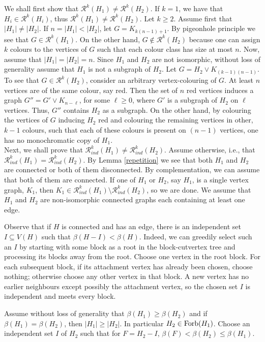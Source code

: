 \documentclass[10pt,a4paper]{article}
\theoremstyle{plain}
\theoremstyle{definition}
\newcommand{\R}{\mathcal{R}}
\newcommand{\Forb}{{\rm Forb}}
\newcommand{\Rk}{\R_{ind}}
\begin{document}
   We shall first show that $\R^k(H_1) \neq \R^k(H_2)$. If $k=1$, we have that $H_i\in \R^k(H_i)$, thus $\R^k(H_1)\neq \R^k(H_2)$. Let $k\geq 2$.
   Assume first that $|H_1|\neq |H_2|$.  If $n=|H_1|<|H_2|$, let  $G=K_{k(n-1)+1}$.  By pigeonhole principle we see that $G\in \R^k(H_1)$. On the other hand, $G\not\in \R^k(H_2)$ because one can assign $k$ colours to the vertices of $G$ such that each colour class has size at most $n$.
   Now, assume that $|H_1|=|H_2|=n$. Since $H_1$ and $H_2$ are not isomorphic, without loss of generality assume that $H_1$ is not a subgraph of $H_2$.
   Let $G=H_2\vee K_{(k-1)(n-1)}$. To see that  $G\in \R^k(H_2)$, consider an arbitrary vertex-colouring of $G$. At least $n$ vertices are of the same colour, say red. Then the set of $n$ red vertices induces 
   a graph $G''=G'\vee K_{n-\ell}$, for some $\ell\geq 0$, where $G'$ is a subgraph of $H_2$ on $\ell$ vertices. Thus, $G''$ contains $H_2$ as a subgraph.
   On the other hand, by colouring the vertices of $G$ inducing  $H_2$ red and colouring  the remaining vertices in other, $k-1$ colours, such that each of these colours is present on $(n-1)$ vertices,  one has no monochromatic copy of $H_1$.\\
 
 Next, we shall prove that $\R_{ind}^k(H_1) \neq \R_{ind}^k(H_2)$.  Assume otherwise, i.e., that $\R_{ind}^k(H_1) = \R_{ind}^k(H_2)$.
 By Lemma \ref{repetition} we see  that both $H_1$ and $H_2$ are connected or both of them disconnected. By complementation, we can  assume that 
both of them are connected. If one of $H_1$ or $H_2$, say $H_1$, is a single vertex graph, $K_1$,  then $K_1\in \Rk^k(H_1)\setminus \Rk^k(H_2)$, so we are done.  We assume that $H_1$ and $H_2$ are  non-isomorphic connected graphs each containing at least one edge. 

Observe that if $H$ is connected and has an edge, there is an independent set
$I\subseteq V(H)$ such that $\beta(H-I)<\beta(H)$.
Indeed, we can greedily select such an $I$ by starting with some block as a root  in the block-cutvertex tree and processing its blocks away from the root.
Choose one vertex in the root block. For each subsequent block, if its
attachment vertex has already been chosen, choose nothing; otherwise
choose any other vertex in that block. A new vertex has no earlier
neighbours except possibly the attachment vertex, so the chosen set $I$
is independent and meets every block. 


 Assume without loss of generality that $\beta(H_1)\geq \beta(H_2)$ and if $\beta(H_1)=\beta(H_2)$, then 
$|H_1|\geq |H_2|$. In particular  $H_2\in \Forb(H_1)$. Choose an independent set $I$ of $H_2$ such that for $F=H_2-I$, 
 $\beta(F)<\beta(H_2)\leq\beta(H_1)$. 
 
\end{document}
